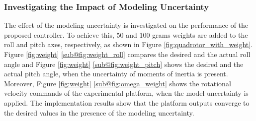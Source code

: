 \documentclass[3p]{elsarticle}
\begin{document}
\subsubsection{Investigating the Impact of Modeling Uncertainty}\label{sec:model-uncertainty}
\noindent The effect of the modeling uncertainty is investigated on the performance of the proposed controller.
To achieve this, 50 and 100 grams weights are added to the roll and pitch axes, respectively, as shown in Figure \ref{fig:quadrotor_with_weight}.
Figure \ref{fig:weight} \ref{sub@fig:weight_roll} compares the desired and the actual roll angle and Figure \ref{fig:weight} \ref{sub@fig:weight_pitch} shows the desired and the actual pitch angle, when the uncertainty of moments of inertia is present.
Moreover, Figure \ref{fig:weight} \ref{sub@fig:omega_weight} shows the rotational velocity commands of the experimental platform, when the model uncertainty is applied.
The implementation results show that the platform outputs converge to the desired values in the presence of the modeling uncertainty.
\end{document}
